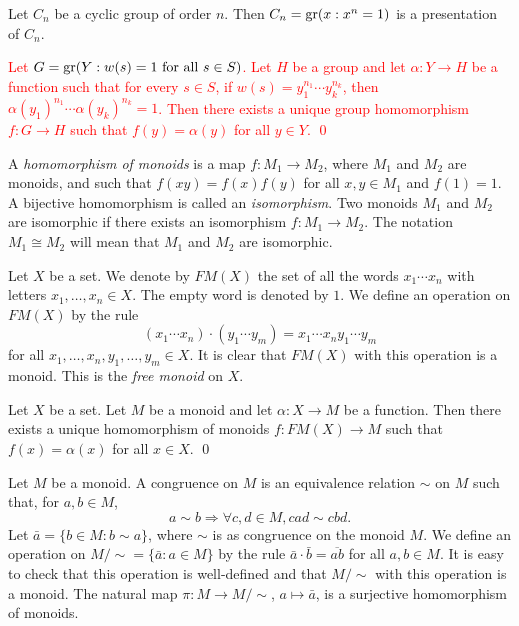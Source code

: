 \begin{example}
    Let $C_n$ be a cyclic group of order $n$. 
    Then $C_n=\operatorname{gr}(x: x^n=1)$ is a presentation of $C_n$.
\end{example}

\textcolor{red}{
\begin{proposition}\label{prop:presentation}
Let $G=\operatorname{gr}(Y: w(s)=1\mbox{ for all }s\in S)$. Let $H$ be a group and let $\alpha\colon Y\rightarrow H$ be a function such that for every $s\in S$, if $w(s)=y_1^{n_1}\cdots y_k^{n_k}$, then $\alpha(y_1)^{n_1}\cdots \alpha(y_k)^{n_k}=1$. Then there exists a unique group homomorphism $f\colon G\rightarrow H$ such that $f(y)=\alpha(y)$ for all $y\in Y$. \qed
\end{proposition}}

A {\em homomorphism of monoids} is a map $f\colon M_1\rightarrow M_2$, where $M_1$ and $M_2$ are monoids, and such that $f(xy)=f(x)f(y)$ for all $x,y\in M_1$ and $f(1)=1$. A bijective homomorphism is called an {\em isomorphism}. Two monoids $M_1$ and $M_2$ are isomorphic if there exists an isomorphism $f\colon M_1\rightarrow M_2$. The notation $M_1\cong M_2$ will mean that $M_1$ and $M_2$ are isomorphic. 

Let $X$ be a set. We denote by $FM(X)$ the set of all the words $x_1\cdots x_n$ with letters $x_1,\dots ,x_n\in X$. The empty word is denoted by $1$. We define an operation on $FM(X)$ by the rule
\[ (x_1\cdots x_n)\cdot (y_1\cdots y_m)=x_1\cdots x_ny_1\cdots y_m\]
for all $x_1,\dots ,x_n,y_1,\dots ,y_m\in X$. It is clear that $FM(X)$ with this operation is a monoid. This is the {\em free monoid} on $X$.

\begin{proposition}
Let $X$ be a set. Let $M$ be a monoid and let $\alpha\colon X\rightarrow M$ be a function. Then there exists a unique homomorphism of monoids $f\colon FM(X)\rightarrow M$ such that $f(x)=\alpha(x)$ for all $x\in X$. \qed
\end{proposition}

Let $M$ be a monoid. A congruence on $M$ is an equivalence relation $\sim$ on $M$ such that, for $a,b\in M$,
\[ a\sim b\Rightarrow \forall c,d\in M, cad\sim cbd.\]
Let $\bar a=\{ b\in M : b\sim a\}$, where $\sim$ is as congruence on the monoid $M$. We define an operation on $M/\sim=\{ \bar a : a\in M\}$ by the rule $\bar a\cdot \bar b=\overline{ab}$ for all $a,b\in M$. It is easy to check that this operation is well-defined and that $M/\sim$ with this operation is a monoid. The natural map $\pi\colon M\rightarrow M/\sim$, $a\mapsto \bar a$, is a surjective homomorphism of monoids.

